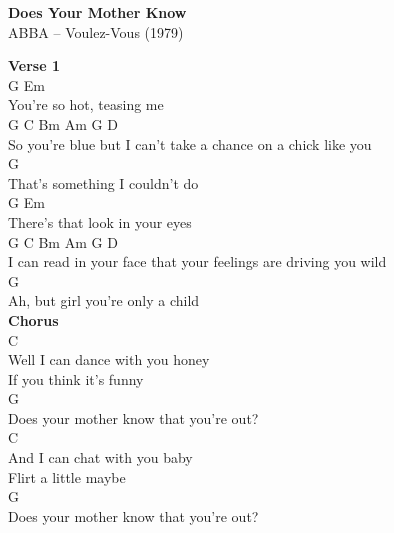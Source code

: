 \documentclass[a4paper]{article}
\begin{document}
    \begin{center}
        \textbf{Does Your Mother Know}
        ~\\
        ABBA -- Voulez-Vous (1979)
    \end{center}
    {
        \scriptsize
        \textbf{Verse 1}
        ~\\
        {
            \cutive
            \obeyspaces
G                      Em
\\
You're so hot, teasing me
\\
G         C          Bm           Am          G          D
\\
So you're blue but I can't take a chance on a chick like you
\\
                               G
\\
That's something I couldn't do
\\
G                         Em
\\
There's that look in your eyes
\\
G     C            Bm             Am           G           D
\\
I can read in your face that your feelings are driving you wild
\\
                                 G
\\
Ah, but girl you're only a child
\\

        }
        \textbf{Chorus}
        ~\\
        {
            \cutive
            \obeyspaces
C
\\
Well I can dance with you honey
\\
If you think it's funny
\\
                                  G
\\
Does your mother know that you're out?
\\
C
\\
And I can chat with you baby
\\
Flirt a little maybe
\\
                                  G
\\
Does your mother know that you're out?
\\

}}
\end{document}
